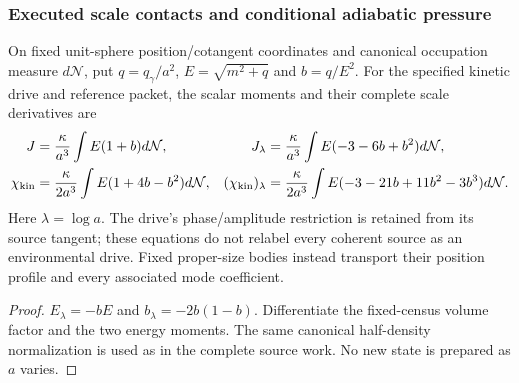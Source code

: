 \documentclass[12pt,a4paper]{article}
\begin{document}
\subsubsection{Executed scale contacts and conditional adiabatic pressure}
\begin{proposition}
\label{p8:prop:v2206-kinetic-scale-jets}
On fixed unit-sphere position/cotangent coordinates and canonical
occupation measure $d\mathcal N$, put
$q=q_\gamma/a^2$, $E=\sqrt{m^2+q}$ and $b=q/E^2$.
For the specified kinetic drive and reference packet, the scalar moments
and their complete scale derivatives are
\begin{align}
\label{p8:eq:v2206-kinetic-scale-jets}
 J&=\frac{\kappa}{a^3}\int E(1+b)d\mathcal N,
 &J_\lambda&=\frac{\kappa}{a^3}\int E(-3-6b+b^2)d\mathcal N,\\
 \chi_{\rm kin}&=\frac{\kappa}{2a^3}\int E(1+4b-b^2)d\mathcal N,
 &(\chi_{\rm kin})_\lambda&=\frac{\kappa}{2a^3}
        \int E(-3-21b+11b^2-3b^3)d\mathcal N.\nonumber
\end{align}
Here $\lambda=\log a$. The drive's phase/amplitude restriction is retained
from its source tangent; these equations do not relabel every coherent
source as an environmental drive. Fixed proper-size bodies instead
transport their position profile and every associated mode coefficient.
\end{proposition}
\begin{proof}
$E_\lambda=-bE$ and $b_\lambda=-2b(1-b)$.
Differentiate the fixed-census volume factor and the two energy moments.
The same canonical half-density normalization is used as in the complete
source work. No new state is prepared as $a$ varies.
\end{proof}
\end{document}
